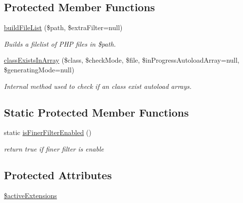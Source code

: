 \subsection*{Protected Member Functions}
\begin{DoxyCompactItemize}
\item 
\hyperlink{classextension_1_1ezadvancedautoload_1_1pv_1_1classes_1_1e_z_autoload_generator_a395ea8ecd54bad970889066e563333b4}{build\-File\-List} (\$path, \$extra\-Filter=null)
\begin{DoxyCompactList}\small\item\em Builds a filelist of P\-H\-P files in \$path. \end{DoxyCompactList}\item 
\hyperlink{classextension_1_1ezadvancedautoload_1_1pv_1_1classes_1_1e_z_autoload_generator_a7826365f88fc9c2d5b3cfbb585db29b3}{class\-Exists\-In\-Array} (\$class, \$check\-Mode, \$file, \$in\-Progress\-Autoload\-Array=null, \$generating\-Mode=null)
\begin{DoxyCompactList}\small\item\em Internal method used to check if an class exist autoload arrays. \end{DoxyCompactList}\end{DoxyCompactItemize}
\subsection*{Static Protected Member Functions}
\begin{DoxyCompactItemize}
\item 
static \hyperlink{classextension_1_1ezadvancedautoload_1_1pv_1_1classes_1_1e_z_autoload_generator_afd315c7aa866c6a1bfcf75ae27ce8c3b}{is\-Finer\-Filter\-Enabled} ()
\begin{DoxyCompactList}\small\item\em return true if finer filter is enable \end{DoxyCompactList}\end{DoxyCompactItemize}
\subsection*{Protected Attributes}
\begin{DoxyCompactItemize}
\item 
\hyperlink{classextension_1_1ezadvancedautoload_1_1pv_1_1classes_1_1e_z_autoload_generator_abe431f515e0a071f1ca74fd276813c19}{\$active\-Extensions}
\end{DoxyCompactItemize}
